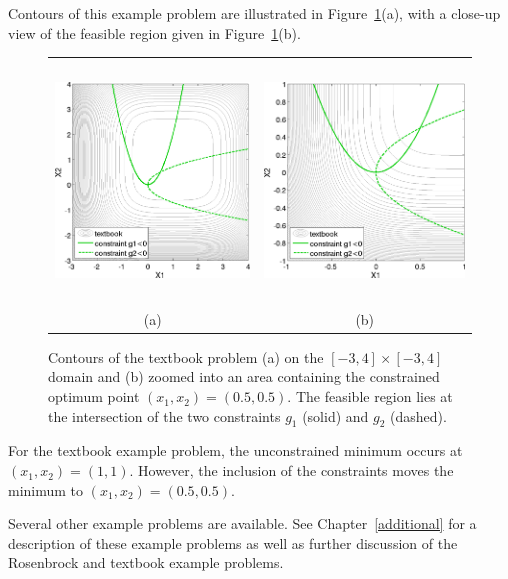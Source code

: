 Contours of this example problem are illustrated in
Figure~\ref{tutorial:textbook_prob}(a), with a close-up view of
the feasible region given in
Figure~\ref{tutorial:textbook_prob}(b).

\begin{figure}[htp!]
  \centering
  \begin{tabular}{cc}
  \includegraphics[height=2.5in]{images/textbook_contours} &
  \includegraphics[height=2.5in]{images/textbook_closeup} \\
  (a) & (b) \\
  \end{tabular}
  \caption{Contours of the textbook problem (a) on the $[-3,4] \times
    [-3,4]$ domain and (b) zoomed into an area containing the
    constrained optimum point $(x_1,x_2) = (0.5,0.5)$. The
    feasible region lies at the intersection of the two constraints
    $g_1$ (solid) and $g_2$ (dashed).}
  \label{tutorial:textbook_prob}
\end{figure}

For the textbook example problem, the unconstrained minimum occurs at
$(x_1,x_2) = (1,1)$. However, the inclusion of the constraints
moves the minimum to $(x_1,x_2) = (0.5,0.5)$.

Several other example problems are available. See
Chapter~\ref{additional} for a description of these example problems
as well as further discussion of the Rosenbrock and textbook example
problems.

